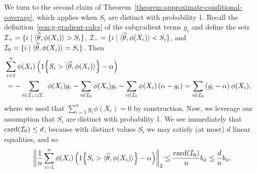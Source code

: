 \documentclass{article}
\newcommand{\radphi}{b_{\phi}}
\newcommand{\scorerv}{S}
\begin{document}
We turn to the second claim of
Theorem~\ref{theorem:approximate-conditional-coverage}, which applies when
$\scorerv_i$ are distinct with probability 1.
%
Recall the definition~\eqref{eqn:g-gradient-calcs} of the subgradient terms
$g_i$ and define the sets $\mc{I}_+ = \{i \mid \<\what{\theta},
\phi(X_i)\> > \scorerv_i\}$, $\mc{I}_- = \{i \mid \<\what{\theta},
\phi(X_i)\> < \scorerv_i\}$, and $\mc{I}_0 = \{i \mid \<\what{\theta},
\phi(X_i)\> = \scorerv_i\}$.
%
Then
\begin{align*}
  \lefteqn{\sum_{i = 1}^n \phi(X_i)
    \left(\indic{\scorerv_i > \<\what{\theta}, \phi(X_i)\>}
    - \alpha\right)} \\
  & =
  - \sum_{i \in \mc{I}_+ \cup \mc{I}_-}
  \phi(X_i) g_i
  - \sum_{i \in \mc{I}_0} \phi(X_i) g_i
  - \sum_{i \in \mc{I}_0} \phi(X_i) \left(\alpha - g_i\right)
  = \sum_{i \in \mc{I}_0}
  \left(g_i - \alpha\right) \phi(X_i),
\end{align*}
where we used that $\sum_{i = 1}^n g_i \phi(X_i) = 0$ by construction.
%
Now, we leverage our assumption that $\scorerv_i$ are distinct with
probability 1.
%
We see immediately that $\mathop{\rm card}(\mathcal{I}_0) \le d$, because with
distinct values $\scorerv_i$ we may satisfy (at most) $d$ linear equalities,
and so
\begin{align*}
  \ltwobigg{\frac{1}{n} \sum_{i = 1}^n
    \phi(X_i) \left(
    \indic{\scorerv_i > \<\what{\theta}, \phi(X_i)\>} - \alpha
    \right)}
  \le \frac{\card(\mc{I}_0)}{n}
  \radphi
  \le \frac{d}{n} \radphi.
\end{align*}
\end{document}
